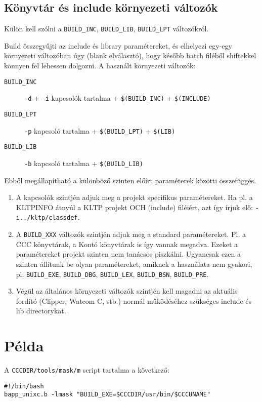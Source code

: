 \subsection{Könyvtár és include környezeti változók}


Külön kell szólni a 
{\tt BUILD\_INC}, {\tt BUILD\_LIB}, {\tt BUILD\_LPT} változókról. 

Build összegyűjti az include és library paramétereket, 
és elhelyezi egy-egy környezeti változóban úgy (blank elválasztó),
hogy később batch filéből shiftekkel könnyen fel lehessen dolgozni.
A használt környezeti változók:
\begin{description}
\item[{\tt BUILD\_INC}] {\tt -d} + {\tt -i} kapcsolók tartalma + \verb'$(BUILD_INC)' + \verb'$(INCLUDE)' 
\item[{\tt BUILD\_LPT}] {\tt -p} kapcsoló tartalma + \verb'$(BUILD_LPT)' + \verb'$(LIB)'  
\item[{\tt BUILD\_LIB}] {\tt -b} kapcsoló tartalma + \verb'$(BUILD_LIB)' 
\end{description}
Ebből megállapítható a különböző szinten előírt paraméterek
közötti összefüggés.

\begin{enumerate}
\item 
  A kapcsolók szintjén adjuk meg a projekt specifikus 
  paramétereket. Ha pl. a KLTPINFO átnyúl a KLTP projekt
  OCH (include) filéiért, azt így írjuk elő: \verb'-i../kltp/classdef'.
\item 
  A \verb'BUILD_XXX' változók szintjén adjuk meg a standard 
  paramétereket. Pl. a CCC könyvtárak, a Kontó könyvtárak is
  így vannak megadva. Ezeket a paramétereket projekt szinten
  nem tanácsos piszkálni. Ugyancsak ezen a szinten állítunk
  be olyan paramétereket, amiknek a használata nem gyakori,
  pl. \verb'BUILD_EXE', 
      \verb'BUILD_DBG', 
      \verb'BUILD_LEX', 
      \verb'BUILD_BSN', 
      \verb'BUILD_PRE'.
\item 
  Végül az általános környezeti változók szintjén kell magadni 
  az aktuális fordító (Clipper, Watcom C, stb.) normál működéséhez
  szükséges include és lib directorykat.
\end{enumerate}


\section{Példa}

A \verb!CCCDIR/tools/mask/m! script tartalma a következő:
\begin{verbatim}
#!/bin/bash
bapp_unixc.b -lmask "BUILD_EXE=$CCCDIR/usr/bin/$CCCUNAME" 
\end{verbatim}

